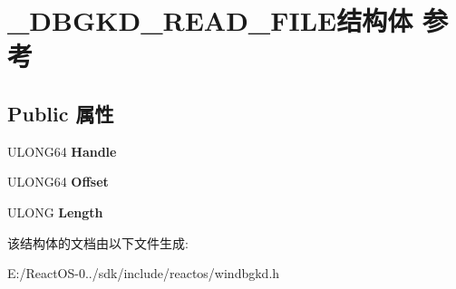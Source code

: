 \hypertarget{struct___d_b_g_k_d___r_e_a_d___f_i_l_e}{}\section{\+\_\+\+D\+B\+G\+K\+D\+\_\+\+R\+E\+A\+D\+\_\+\+F\+I\+L\+E结构体 参考}
\label{struct___d_b_g_k_d___r_e_a_d___f_i_l_e}
\subsection*{Public 属性}
\begin{DoxyCompactItemize}
\item 
\mbox{\label{struct___d_b_g_k_d___r_e_a_d___f_i_l_e_a9892d75c328050abe08ed23504f3849c}} 
U\+L\+O\+N\+G64 {\bfseries Handle}
\item 
\mbox{\label{struct___d_b_g_k_d___r_e_a_d___f_i_l_e_a74d4c4ff3d8036c0f1b2232efef82108}} 
U\+L\+O\+N\+G64 {\bfseries Offset}
\item 
\mbox{\label{struct___d_b_g_k_d___r_e_a_d___f_i_l_e_a72be7e905f6446698a310b162b6216e4}} 
U\+L\+O\+NG {\bfseries Length}
\end{DoxyCompactItemize}


该结构体的文档由以下文件生成\+:\begin{DoxyCompactItemize}
\item 
E\+:/\+React\+O\+S-\/0../sdk/include/reactos/windbgkd.\+h\end{DoxyCompactItemize}
